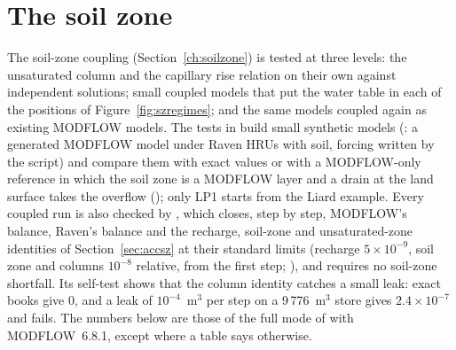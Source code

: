 \section{The soil zone}\label{sec:vsoilzone}
The soil-zone coupling (Section~\ref{ch:soilzone}) is tested at three levels: the unsaturated column and the capillary rise
relation on their own against independent solutions; small coupled models that put the water table in each of the
positions of Figure~\ref{fig:szregimes}; and the same models coupled again as existing MODFLOW models. The tests in
 build small synthetic models (: a generated MODFLOW model under Raven HRUs with
soil, forcing written by the script) and compare them with exact values or with a MODFLOW-only reference in which the soil
zone is a MODFLOW layer and a drain at the land surface takes the overflow (); only LP1 starts from the
Liard example. Every coupled run is also checked by , which closes, step by step, MODFLOW's balance,
Raven's balance and the recharge, soil-zone and unsaturated-zone identities of Section~\ref{sec:accsz} at their standard
limits (recharge $5\times10^{-9}$, soil zone and columns $10^{-8}$ relative, from the first step; ),
and requires no soil-zone shortfall. Its self-test shows that the column identity catches a small leak: exact books give 0,
and a leak of $10^{-4}$~m$^3$ per step on a 9\,776~m$^3$ store gives $2.4\times10^{-7}$ and fails. The numbers below are those
of the full mode of  with MODFLOW~6.8.1, except where a table says otherwise.

